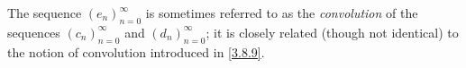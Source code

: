 \begin{rmk}\label{4.4.2}
  The sequence \((e_n)_{n = 0}^\infty\) is sometimes referred to as the \emph{convolution} of the sequences \((c_n)_{n = 0}^\infty\) and \((d_n)_{n = 0}^\infty\);
  it is closely related (though not identical) to the notion of convolution introduced in \cref{3.8.9}.
\end{rmk}